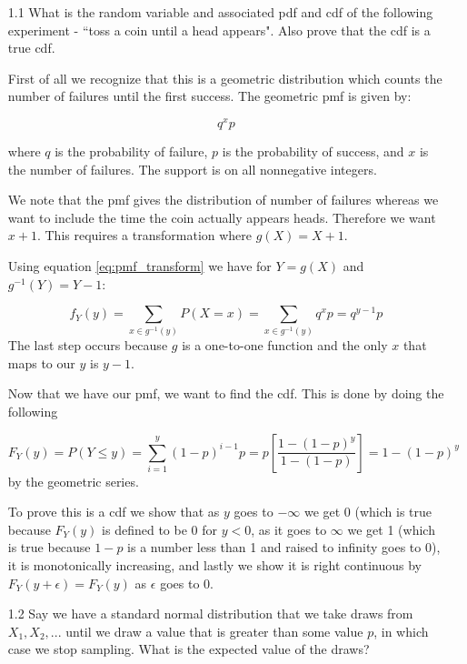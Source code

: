 

\begin{enumerate}

\item[1.1] What is the random variable and associated pdf and cdf of the following experiment - ``toss a coin until a head appears". Also prove that the cdf is a true cdf.

First of all we recognize that this is a geometric distribution which counts the number of failures until the first success. The geometric pmf is given by:

\begin{equation}
q^{x}p
\end{equation}

\noindent where $q$ is the probability of failure, $p$ is the probability of success, and $x$ is the number of failures. The support is on all nonnegative integers. 

We note that the pmf gives the distribution of number of failures whereas we want to include the time the coin actually appears heads. Therefore we want $x+1$. This requires a transformation where $g(X) = X + 1$.

Using equation \ref{eq:pmf_transform} we have for $Y=g(X)$ and $g^{-1}(Y) = Y - 1$:

\begin{equation}
f_Y(y) = \sum_{x \in g^{-1}(y)} P(X = x) = \sum_{x \in g^{-1}(y)} q^{x}p = q^{y-1} p
\end{equation}
\noindent The last step occurs because $g$ is a one-to-one function and the only $x$ that maps to our $y$ is $y-1$. 

Now that we have our pmf, we want to find the cdf. This is done by doing the following

\begin{equation}
F_Y(y) = P(Y \leq y ) = \sum_{i=1}^{y} (1-p)^{i-1}p  = p \left [ \frac{1 - (1-p)^y}{1 - (1-p)} \right ] = 1 - (1-p)^y
\end{equation}
\noindent by the geometric series.

To prove this is a cdf we show that as $y$ goes to $-\infty$ we get 0 (which is true because $F_Y(y)$ is defined to be 0 for $y<0$, as it goes to $\infty$ we get 1 (which is true because $1-p$ is a number less than 1 and raised to infinity goes to 0), it is monotonically increasing, and lastly we show it is right continuous by $F_Y(y+\epsilon) = F_Y(y)$ as $\epsilon$ goes to 0. 



\item[1.2] Say we have a standard normal distribution that we take draws from $X_1, X_2, ...$ until we draw a value that is greater than some value $p$, in which case we stop sampling. What is the expected value of the draws?


\end{enumerate}

